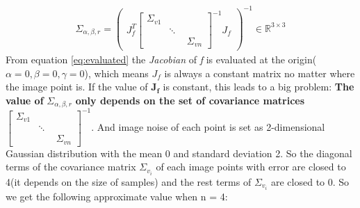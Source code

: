 \begin{align*}
\Sigma_{\alpha,\beta,r} = \begin{pmatrix}
 J_f^T 
                \begin{bmatrix} 
                  \Sigma_{v1} & \quad & \quad\\ 
                  \quad & \ddots & \quad \\
                  \quad & \quad & \Sigma_{vn}
                \end{bmatrix}^{-1} 
 J_f
                          \end{pmatrix}^{-1}
                          \in \mathbb{R}^{3 \times 3}
\end{align*}
From equation \ref{eq:evaluated} the \textit{Jacobian} of \textit{f} is evaluated at the origin($\alpha = 0,\beta = 0,\gamma = 0$), which means $J_f$ is always a constant matrix no matter where the image point is. If the value of $\mathbf{J_f}$ is constant, this leads to a big problem: \textbf{The value of} ${\Sigma_{\alpha,\beta,r}}$  \textbf{only depends on the set of covariance matrices} $                \begin{bmatrix} 
                  \Sigma_{v1} & \quad & \quad\\ 
                  \quad & \ddots & \quad \\
                  \quad & \quad & \Sigma_{vn}
                \end{bmatrix}^{-1}$. 
And image noise of each point is set as 2-dimensional Gaussian distribution with the mean 0 and standard deviation 2. So the diagonal terms of the covariance matrix $\Sigma_{v_i}$ of each image points with error are closed to 4(it depends on the size of samples) and the rest terms of $\Sigma_{v_i}$ are closed to 0. So we get the following approximate value when n = 4:
